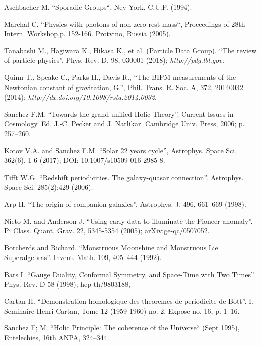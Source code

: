 \documentclass[twoside,draft]{article}
\begin{document}
\begin{sloppypar}
\begin{thebibliography}{99}
 Aschbacher M. ``Sporadic Groups``, Ney-York. C.U.P. (1994).

 Marchal C. ``Physics with photons of non-zero rest mass``, Proceedings of 28th Intern. Workshop,p. 152-166. Protvino, Russia (2005).


 Tanabashi M., Hagiwara K., Hikasa K., et al. (Particle Data
Group). ``The review of particle physics''. Phys. Rev. D, 98, 030001 (2018);
{\it http://pdg.lbl.gov.}

 Quinn T., Speake C., Parks H., Davis R., ``The BIPM measurements
of the Newtonian constant of gravitation, G.'', Phil. Trans. R. Soc. A, 372,
20140032 (2014); {\it http://dx.doi.org/10.1098/rsta.2014.0032}.

 Sanchez F.M. ``Towards the grand unified Holic Theory''. Current
Issues in Cosmology. Ed. J.-C. Pecker and J. Narlikar. Cambridge Univ. Press,
2006; p. 257--260.

 Kotov V.A. and Sanchez F.M. ``Solar 22 years cycle'', Astrophys.
Space Sci. 362(6), 1-6 (2017); DOI: 10.1007/s10509-016-2985-8.

 Tifft W.G. ``Redshift periodicities. The galaxy-quasar
connection''. Astrophys. Space Sci. 285(2):429 (2006).

 Arp H. ``The origin of companion galaxies''. Astrophys. J. 496,
661--669 (1998).

 Nieto M. and Anderson J. ``Using early data to illuminate the
Pioneer anomaly''. Pi Class. Quant. Grav. 22, 5345-5354 (2005);
arXiv:ge-qc/0507052.

 Borcherds and Richard. ``Monstruous Moonshine and Monstruous Lie
Superalgebras''. Invent. Math. 109, 405--444 (1992).

 Bars I. ``Gauge Duality, Conformal Symmetry, and Space-Time with
Two Times''. Phys. Rev. D 58 (1998); hep-th/9803188, 

 Cartan H. ``Demonstration homologique des theoremes de periodicite
de Bott''. I. Seminaire Henri Cartan, Tome 12 (1959-1960) no. 2, Expose no. 16,
p. 1--16.

 Sanchez F; M. ``Holic Principle: The coherence of the Universe`` (Sept 1995), Entelechies, 16th ANPA, 324--344.


\end{thebibliography}
\end{sloppypar}
\end{document}

